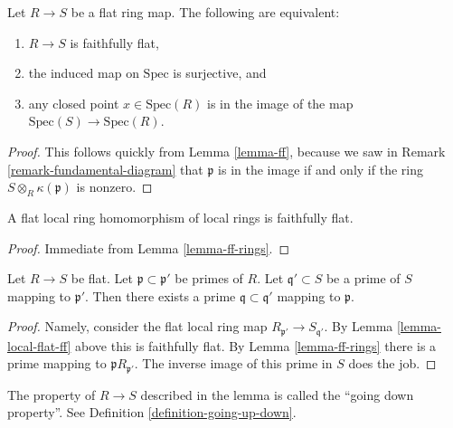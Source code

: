 \begin{lemma}
\label{lemma-ff-rings}
Let $R \to S$ be a flat ring map.
The following are equivalent:
\begin{enumerate}
\item $R \to S$ is faithfully flat,
\item the induced map on $\text{Spec}$ is surjective, and
\item any closed point $x \in \text{Spec}(R)$ is
in the image of the map $\text{Spec}(S) \to \text{Spec}(R)$.
\end{enumerate}
\end{lemma}

\begin{proof}
This follows quickly from Lemma \ref{lemma-ff}, because we
saw in Remark \ref{remark-fundamental-diagram}
that $\mathfrak p$ is in the image
if and only if the ring $S \otimes_R \kappa(\mathfrak p)$
is nonzero.
\end{proof}

\begin{lemma}
\label{lemma-local-flat-ff}
A flat local ring homomorphism of local rings is faithfully flat.
\end{lemma}

\begin{proof}
Immediate from Lemma \ref{lemma-ff-rings}.
\end{proof}

\begin{lemma}
\label{lemma-flat-going-down}
Let $R\to S$ be flat. Let $\mathfrak p \subset \mathfrak p'$
be primes of $R$. Let $\mathfrak q' \subset S$ be a prime of $S$
mapping to $\mathfrak p'$. Then there exists a prime
$\mathfrak q \subset \mathfrak q'$ mapping to $\mathfrak p$.
\end{lemma}

\begin{proof}
Namely, consider the flat local ring map
$R_{\mathfrak p'} \to S_{\mathfrak q'}$.
By Lemma \ref{lemma-local-flat-ff} above this is faithfully
flat. By Lemma \ref{lemma-ff-rings} there is a prime mapping to
$\mathfrak p R_{\mathfrak p'}$. The inverse image of this
prime in $S$ does the job.
\end{proof}

\noindent
The property of $R \to S$ described in the lemma is called the
``going down property''. See Definition \ref{definition-going-up-down}.















